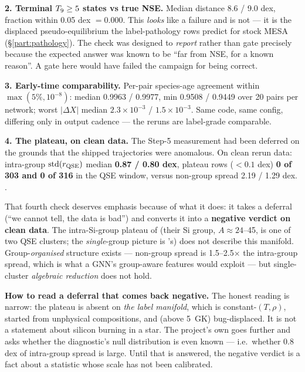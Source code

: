 \textbf{2. Terminal $T_{9} \ge 5$ states vs true NSE.} Median distance 8.6 / 9.0
dex, fraction within 0.05 dex $= 0.000$. This \emph{looks} like a failure and
is not --- it is the displaced pseudo-equilibrium the label-pathology rows
predict for stock MESA (\S\ref{part:pathology}). The check was designed to
\emph{report} rather than gate precisely because the expected answer was known
to be ``far from NSE, for a known reason''. A gate here would have failed the
campaign for being correct.

\textbf{3. Early-time comparability.} Per-pair species-age agreement within
$\max(5\%, 10^{-8})$: median 0.9963 / 0.9977, min 0.9508 / 0.9449 over 20
pairs per network; worst $|\Delta X|$ median $2.3\times10^{-3}$ /
$1.5\times10^{-3}$. Same code, same config, differing only in output cadence
--- the reruns are label-grade comparable.

\textbf{4. The \rQSE{} plateau, on clean data.} The Step-5 measurement had been
deferred on the grounds that the shipped trajectories were anomalous. On clean
rerun data: intra-group $\mathrm{std}(r_{\mathrm{QSE}})$ median \textbf{0.87 / 0.80 dex},
plateau rows ($< 0.1$ dex) \textbf{0 of 303 and 0 of 316} in the QSE window,
versus non-group spread 2.19 / 1.29 dex. .

That fourth check deserves emphasis because of what it does: it takes a
deferral (``we cannot tell, the data is bad'') and converts it into a
\textbf{negative verdict on clean data}. The intra-Si-group \rQSE{} plateau of
\citet{hix1996} (their Si group, $A \approx 24$--45, is one of two QSE
clusters; the \emph{single}-group picture is \citet{bodansky1968}'s) does not
describe this manifold. Group-\emph{organised} structure exists --- non-group
spread is 1.5--2.5$\times$ the intra-group spread, which is what a GNN's
group-aware features would exploit --- but single-cluster \emph{algebraic
reduction} does not hold.

\begin{warn}
\textbf{How to read a deferral that comes back negative.} The honest reading is
narrow: the plateau is absent on \emph{the label manifold}, which is
constant-$(T, \rho)$, started from unphysical compositions, and (above 5~GK)
bug-displaced. It is not a statement about silicon burning in a star. The
project's own  goes further and asks whether the \rQSE{}
diagnostic's null distribution is even known --- i.e.\ whether 0.8 dex of
intra-group spread is large. Until that is answered, the negative verdict is a
fact about a statistic whose scale has not been calibrated.
\end{warn}

